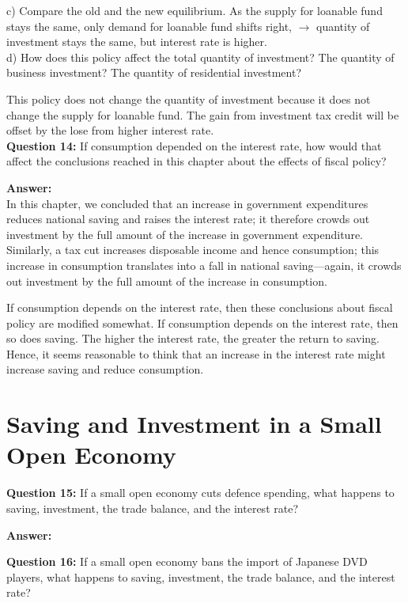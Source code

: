 \documentclass[a4paper, 11pt]{article}
\begin{document}
c) Compare the old and the new equilibrium. 
As the supply for loanable fund stays the same, only demand for loanable fund shifts right, $\rightarrow$ quantity of investment stays the same, but interest rate is higher. \\

d) How does this policy affect the total quantity of investment? The quantity of business investment? The quantity of residential investment?

This policy does not change the quantity of investment because it does not change the supply for loanable fund. The gain from investment tax credit will be offset by the lose from higher interest rate. \\

\textbf{Question 14:} If consumption depended on the interest rate, how would that affect the conclusions reached in this chapter about the effects of fiscal policy?

\textbf{Answer:}  \\

In this chapter, we concluded that an increase in government expenditures reduces
national saving and raises the interest rate; it therefore crowds out investment by the full
amount of the increase in government expenditure. Similarly, a tax cut increases
disposable income and hence consumption; this increase in consumption translates into a
fall in national saving—again, it crowds out investment by the full amount of the increase
in consumption.

If consumption depends on the interest rate, then these conclusions about fiscal policy
are modified somewhat. If consumption depends on the interest rate, then so does saving.
The higher the interest rate, the greater the return to saving. Hence, it seems reasonable
to think that an increase in the interest rate might increase saving and reduce
consumption. \\

\section{Saving and Investment in a Small Open Economy}

\textbf{Question 15:} If a small open economy cuts defence spending, what happens to saving, investment, the trade balance, and the interest rate?

\textbf{Answer:}  

\textbf{Question 16:} If a small open economy bans the import of Japanese DVD players, what happens to saving, investment, the trade balance, and the interest rate?
\end{document}
